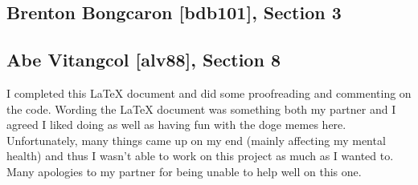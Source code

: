 \documentclass[11pt]{article}
\begin{document}
\subsection*{Brenton Bongcaron [bdb101], Section 3}


\subsection*{Abe Vitangcol [alv88], Section 8}
I completed this \LaTeX\: document and did some proofreading and commenting on the code. Wording the \LaTeX\: document was something both my partner and I agreed I liked doing as well as having fun with the doge memes here. Unfortunately, many things came up on my end (mainly affecting my mental health) and thus I wasn't able to work on this project as much as I wanted to. Many apologies to my partner for being unable to help well on this one.
\end{document}
